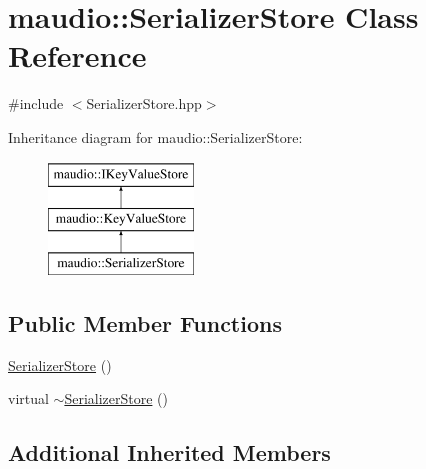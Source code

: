 \hypertarget{classmaudio_1_1SerializerStore}{\section{maudio\-:\-:Serializer\-Store Class Reference}
\label{classmaudio_1_1SerializerStore}
}


{\ttfamily \#include $<$Serializer\-Store.\-hpp$>$}

Inheritance diagram for maudio\-:\-:Serializer\-Store\-:\begin{figure}[H]
\begin{center}
\leavevmode
\includegraphics[height=3.000000cm]{classmaudio_1_1SerializerStore}
\end{center}
\end{figure}
\subsection*{Public Member Functions}
\begin{DoxyCompactItemize}
\item 
\hyperlink{classmaudio_1_1SerializerStore_a57e9c8cac2f585facf9c350e11b92cb8}{Serializer\-Store} ()
\item 
virtual \hyperlink{classmaudio_1_1SerializerStore_a1b821dd09fe274ccc0dc1e6a9b099a92}{$\sim$\-Serializer\-Store} ()
\end{DoxyCompactItemize}
\subsection*{Additional Inherited Members}


